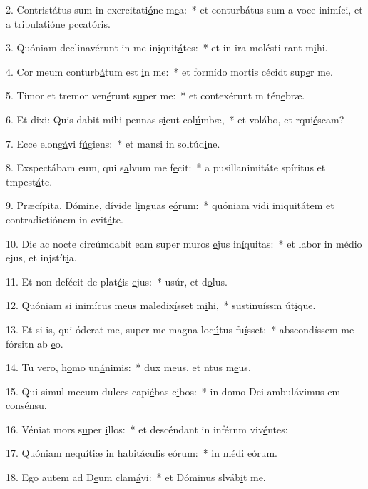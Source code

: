 2. Contristátus sum in exercitati\uline{ó}ne m\uline{e}a:~* et conturbátus sum a voce inimíci, et a tribulatióne pccat\uline{ó}ris.\par 
3. Quóniam declinavérunt in me in\uline{i}quit\uline{á}tes:~* et in ira molésti rant m\uline{i}hi.\par 
4. Cor meum conturb\uline{á}tum est \uline{i}n me:~* et formído mortis cécidt sup\uline{e}r me.\par 
5. Timor et tremor ven\uline{é}runt s\uline{u}per me:~* et contexérunt m tén\uline{e}bræ.\par 
6. Et dixi: Quis dabit mihi pennas s\uline{i}cut col\uline{ú}mbæ,~* et volábo, et rqui\uline{é}scam?\par 
7. Ecce elong\uline{á}vi f\uline{ú}giens:~* et mansi in soltúd\uline{i}ne.\par 
8. Exspectábam eum, qui s\uline{a}lvum me f\uline{e}cit:~* a pusillanimitáte spíritus et tmpest\uline{á}te.\par 
9. Præcípita, Dómine, dívide l\uline{i}nguas e\uline{ó}rum:~* quóniam vidi iniquitátem et contradictiónem in cvit\uline{á}te.\par 
10. Die ac nocte circúmdabit eam super muros \uline{e}jus in\uline{í}quitas:~* et labor in médio ejus, et injstít\uline{i}a.\par 
11. Et non defécit de plat\uline{é}is \uline{e}jus:~* usúr, et d\uline{o}lus.\par 
12. Quóniam si inimícus meus maledix\uline{í}sset m\uline{i}hi,~* sustinuíssm út\uline{i}que.\par 
13. Et si is, qui óderat me, super me magna loc\uline{ú}tus fu\uline{í}sset:~* abscondíssem me fórsitn ab \uline{e}o.\par 
14. Tu vero, h\uline{o}mo un\uline{á}nimis:~* dux meus, et ntus m\uline{e}us.\par 
15. Qui simul mecum dulces capi\uline{é}bas c\uline{i}bos:~* in domo Dei ambulávimus cm cons\uline{é}nsu.\par 
16. Véniat mors s\uline{u}per \uline{i}llos:~* et descéndant in inférnm viv\uline{é}ntes:\par 
17. Quóniam nequítiæ in habitácul\uline{i}s e\uline{ó}rum:~* in médi e\uline{ó}rum.\par 
18. Ego autem ad D\uline{e}um clam\uline{á}vi:~* et Dóminus slváb\uline{i}t me.\par 
